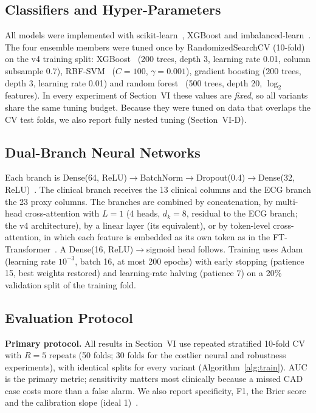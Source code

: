 \subsection{Classifiers and Hyper-Parameters}
All models were implemented with scikit-learn~\cite{pedregosa2011}, XGBoost and imbalanced-learn~\cite{lemaitre2017}. The four ensemble members were tuned once by RandomizedSearchCV (10-fold) on the v4 training split: XGBoost~\cite{chen2016} (200 trees, depth 3, learning rate 0.01, column subsample 0.7), RBF-SVM~\cite{cortes1995} ($C=100$, $\gamma=0.001$), gradient boosting (200 trees, depth 3, learning rate 0.01) and random forest~\cite{breiman2001} (500 trees, depth 20, $\log_2$ features). In every experiment of Section~VI these values are \emph{fixed}, so all variants share the same tuning budget. Because they were tuned on data that overlaps the CV test folds, we also report fully nested tuning (Section~VI-D).

\subsection{Dual-Branch Neural Networks}
Each branch is Dense(64, ReLU)$\rightarrow$BatchNorm$\rightarrow$Dropout(0.4)$\rightarrow$Dense(32, ReLU)~\cite{ioffe2015,srivastava2014}. The clinical branch receives the 13 clinical columns and the ECG branch the 23 proxy columns. The branches are combined by concatenation, by multi-head cross-attention with $L=1$ (4 heads, $d_k=8$, residual to the ECG branch; the v4 architecture), by a linear layer (its equivalent), or by token-level cross-attention, in which each feature is embedded as its own token as in the FT-Transformer~\cite{gorishniy2021}. A Dense(16, ReLU)$\rightarrow$sigmoid head follows. Training uses Adam~\cite{kingma2015} (learning rate $10^{-3}$, batch 16, at most 200 epochs) with early stopping (patience 15, best weights restored) and learning-rate halving (patience 7) on a 20\% validation split of the training fold. 

\subsection{Evaluation Protocol}
\textbf{Primary protocol.} All results in Section~VI use repeated stratified 10-fold CV with $R=5$ repeats (50 folds; 30 folds for the costlier neural and robustness experiments), with identical splits for every variant (Algorithm~\ref{alg:train}). AUC is the primary metric; sensitivity matters most clinically because a missed CAD case costs more than a false alarm. We also report specificity, F1, the Brier score and the calibration slope (ideal 1)~\cite{vancalster2019}.

